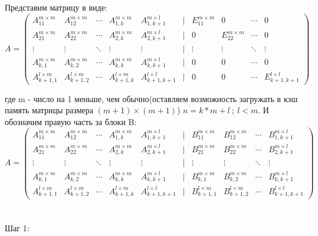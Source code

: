 \documentclass[a4paper,12pt]{article}
\begin{document}
Представим матрицу в виде:
$$A=
  \begin{pmatrix} 
    A_{11}^{m \times m} & A_{12}^{m \times m} & \cdots & A_{1,k}^{m \times m} & A_{1,k+1}^{m \times l} & | & E_{11}^{m \times m} &0 & \cdots &0\\
    A_{21}^{m \times m} & A_{22}^{m \times m} & \cdots & A_{2,k}^{m \times m} & A_{2,k+1}^{m \times l} & | & 0 & E_{22}^{m \times m} & \cdots & 0\\ 
    \vdots & \vdots & \ddots & \vdots & \vdots & | & \vdots & \vdots & \ddots & \vdots\\ 
    A_{k,1}^{m \times m} & A_{k,2}^{m \times m} & \cdots & A_{k,k}^{m \times m} & A_{k,k+1}^{m \times l} & | & 0 & 0 & \cdots& 0\\
    A_{k+1,1}^{l \times m} & A_{k+1,2}^{l \times m} & \cdots & A_{k+1,k}^{l \times m} & A_{k+1,k+1}^{l \times l} & | & 0 & 0 & \cdots & E_{k+1,k+1}^{l \times l} 
  \end{pmatrix}
$$

где m - число на 1 меньше, чем обычно(оставляем возможность загружать в кэш память матрицы размера $(m+1)\times (m+1)$) $n = k*m + l \ ; \ l<m$.
И обозначим правую часть за блоки B: 
\begin{equation}
A=
  \begin{pmatrix} 
     A_{11}^{m \times m} & A_{12}^{m \times m} & \cdots & A_{1,k}^{m \times m} & A_{1,k+1}^{m \times l} & | & B_{11}^{m \times m} &  B_{12}^{m \times m} & \cdots & B_{1,k+1}^{m \times l}\\
    A_{21}^{m \times m} & A_{22}^{m \times m} & \cdots & A_{2,k}^{m \times m} & A_{2,k+1}^{m \times l} & | & B_{21}^{m \times m} &  B_{22}^{m \times m} & \cdots & B_{2,k+1}^{m \times l}\\ 
    \vdots & \vdots & \ddots & \vdots & \vdots & | & \vdots & \vdots & \ddots & \vdots\\ 
     A_{k,1}^{m \times m} & A_{k,2}^{m \times m} & \cdots & A_{k,k}^{m \times m} & A_{k,k+1}^{m \times l} & | & B_{k,1}^{m \times m} &  B_{k,2}^{m \times m} & \cdots & B_{k,k+1}^{m \times l}\\
     A_{k+1,1}^{l \times m} & A_{k+1,2}^{l \times m} & \cdots & A_{k+1,k}^{l \times m} & A_{k+1,k+1}^{l \times l} & | & B_{k+1,1}^{l \times m} &  B_{k+1,2}^{l \times m} & \cdots & B_{k+1,k+1}^{l \times l} 
  \end{pmatrix}
\end{equation}
\\\\


{\fontsize{15}{15}\selectfont Шаг 1:}\\\\
\end{document}

